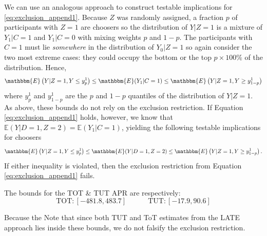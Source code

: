 We can use an analogous approach to construct testable implications for \ref{eq:exclusion_append1}. 
Because $Z$ was randomly assigned, a fraction $p$ of participants with $Z = 1$ are choosers so the distribution of $Y|Z=1$ is a mixture of $Y_1|C=1$ and $Y_1|C=0$ with mixing weights $p$ and $1 -p$.
The participants with $C = 1$ must lie \emph{somewhere} in the distribution of $Y_0|Z=1$ so again consider the two most extreme cases: they could occupy the bottom or the top $p\times 100\%$ of the distribution. 
Hence,
\[
\mathbbm{E}\left(Y|Z=1,Y\leq y^1_{p}\right) \leq \mathbbm{E}(Y_1|C=1) \leq \mathbbm{E}\left(Y|Z=1,Y \geq y^1_{1-p}\right)
\]
where $y^1_p$ and $y^1_{1-p}$ are the $p$ and $1 - p$ quantiles of the distribution of $Y|Z=1$.
As above, these bounds do not rely on the exclusion restriction.
If Equation \ref{eq:exclusion_append1} holds, however, we know that $\mathbb{E}(Y|D=1,Z=2) = \mathbb{E}(Y_1|C=1)$, yielding the following testable implications for choosers
\begin{equation}
\mathbbm{E}\left(Y|Z=1,Y\leq y^1_{p}\right) \leq \mathbbm{E}(Y|D=1,Z=2) \leq \mathbbm{E}\left(Y|Z=1,Y \geq y^1_{1-p}\right).
\label{eq:testable1}
\end{equation}
If either inequality is violated, then the exclusion restriction from Equation \ref{eq:exclusion_append1} fails.


The \cite{huber_mellace} bounds for the TOT \& TUT APR are respectively:
\[\text{TOT} : [-481.8, 483.7]\quad\quad\quad\text{TUT} : [-17.9, 90.6]\]

Because the Note that since both TUT and ToT estimates from the LATE approach lies inside these bounds, we do not falsify the exclusion restriction. 


\newpage





